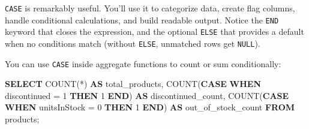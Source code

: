 \documentclass[
  letterpaper,
  DIV=11,
  numbers=noendperiod]{scrreprt}
\newenvironment{Shaded}{\begin{snugshade}}{\end{snugshade}}
\newcommand{\ControlFlowTok}[1]{\textcolor[rgb]{0.00,0.23,0.31}{\textbf{#1}}}
\newcommand{\DecValTok}[1]{\textcolor[rgb]{0.68,0.00,0.00}{#1}}
\newcommand{\FunctionTok}[1]{\textcolor[rgb]{0.28,0.35,0.67}{#1}}
\newcommand{\KeywordTok}[1]{\textcolor[rgb]{0.00,0.23,0.31}{\textbf{#1}}}
\newcommand{\NormalTok}[1]{\textcolor[rgb]{0.00,0.23,0.31}{#1}}
\newcommand{\OperatorTok}[1]{\textcolor[rgb]{0.37,0.37,0.37}{#1}}
\begin{document}
\texttt{CASE} is remarkably useful. You'll use it to categorize data,
create flag columns, handle conditional calculations, and build readable
output. Notice the \texttt{END} keyword that closes the expression, and
the optional \texttt{ELSE} that provides a default when no conditions
match (without \texttt{ELSE}, unmatched rows get \texttt{NULL}).

You can use \texttt{CASE} inside aggregate functions to count or sum
conditionally:

\begin{codelisting}

\caption{\texttt{duckdb}}

\begin{Shaded}
\begin{Highlighting}[]
\KeywordTok{SELECT}
    \FunctionTok{COUNT}\NormalTok{(}\OperatorTok{*}\NormalTok{) }\KeywordTok{AS}\NormalTok{ total\_products,}
    \FunctionTok{COUNT}\NormalTok{(}\ControlFlowTok{CASE} \ControlFlowTok{WHEN}\NormalTok{ discontinued }\OperatorTok{=} \DecValTok{1} \ControlFlowTok{THEN} \DecValTok{1} \ControlFlowTok{END}\NormalTok{) }\KeywordTok{AS}\NormalTok{ discontinued\_count,}
    \FunctionTok{COUNT}\NormalTok{(}\ControlFlowTok{CASE} \ControlFlowTok{WHEN}\NormalTok{ unitsInStock }\OperatorTok{=} \DecValTok{0} \ControlFlowTok{THEN} \DecValTok{1} \ControlFlowTok{END}\NormalTok{) }\KeywordTok{AS}\NormalTok{ out\_of\_stock\_count}
\KeywordTok{FROM}\NormalTok{ products;}
\end{Highlighting}
\end{Shaded}

\end{codelisting}
\end{document}
